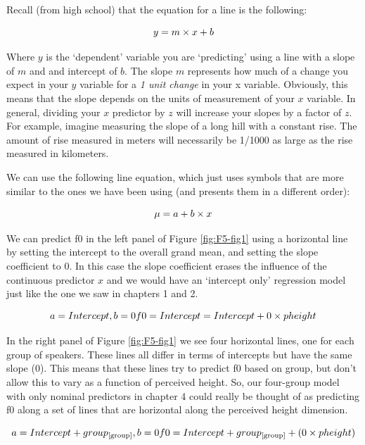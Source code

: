 \documentclass[
]{book}
\begin{document}
Recall (from high school) that the equation for a line is the following:

\[
y = m \times x + b \\ 
\label{eq:51}
\]

Where \(y\) is the `dependent' variable you are `predicting' using a line with a slope of \(m\) and and intercept of \(b\). The slope \(m\) represents how much of a change you expect in your \(y\) variable for a \emph{1 unit change} in your x variable. Obviously, this means that the slope depends on the units of measurement of your \(x\) variable. In general, dividing your \(x\) predictor by \(z\) will increase your slopes by a factor of \(z\). For example, imagine measuring the slope of a long hill with a constant rise. The amount of rise measured in meters will necessarily be 1/1000 as large as the rise measured in kilometers.

We can use the following line equation, which just uses symbols that are more similar to the ones we have been using (and presents them in a different order):

\[
\mu = a + b \times x \\
\label{eq:52}
\]

We can predict f0 in the left panel of Figure \ref{fig:F5-fig1} using a horizontal line by setting the intercept to the overall grand mean, and setting the slope coefficient to 0. In this case the slope coefficient erases the influence of the continuous predictor \(x\) and we would have an `intercept only' regression model just like the one we saw in chapters 1 and 2.

\[
a = Intercept, b = 0 \\ \\
f0 = Intercept = Intercept + 0 \times pheight \\
\label{eq:53}
\]

In the right panel of Figure \ref{fig:F5-fig1} we see four horizontal lines, one for each group of speakers. These lines all differ in terms of intercepts but have the same slope (0). This means that these lines try to predict f0 based on group, but don't allow this to vary as a function of perceived height. So, our four-group model with only nominal predictors in chapter 4 could really be thought of as predicting f0 along a set of lines that are horizontal along the perceived height dimension.

\[
a = Intercept + group_{[\mathrm{group}]}, b = 0 \\ \\
f0 = Intercept + group_{[\mathrm{group}]} + (0 \times pheight) \\
\label{eq:56}
\]
\end{document}
